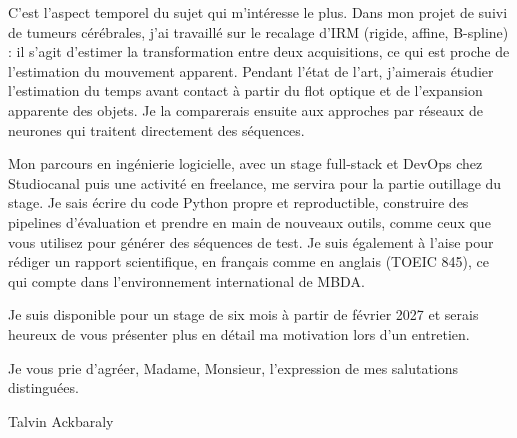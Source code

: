 \documentclass[11pt, a4paper]{extarticle}
\begin{document}
C'est l'aspect temporel du sujet qui m'intéresse le plus. Dans mon projet de suivi de tumeurs
cérébrales, j'ai travaillé sur le recalage d'IRM (rigide, affine, B-spline) : il s'agit d'estimer
la transformation entre deux acquisitions, ce qui est proche de l'estimation du mouvement
apparent. Pendant l'état de l'art, j'aimerais étudier l'estimation du temps avant contact à
partir du flot optique et de l'expansion apparente des objets. Je la comparerais ensuite aux
approches par réseaux de neurones qui traitent directement des séquences.

Mon parcours en ingénierie logicielle, avec un stage full-stack et DevOps chez Studiocanal puis
une activité en freelance, me servira pour la partie outillage du stage. Je sais écrire du code
Python propre et reproductible, construire des pipelines d'évaluation et prendre en main de
nouveaux outils, comme ceux que vous utilisez pour générer des séquences de test. Je suis
également à l'aise pour rédiger un rapport scientifique, en français comme en anglais
(TOEIC 845), ce qui compte dans l'environnement international de MBDA.

Je suis disponible pour un stage de six mois à partir de février 2027 et serais heureux de vous
présenter plus en détail ma motivation lors d'un entretien.

Je vous prie d'agréer, Madame, Monsieur, l'expression de mes salutations distinguées.

\vspace{10pt}
\hfill Talvin Ackbaraly\hspace*{1cm}
\end{document}
